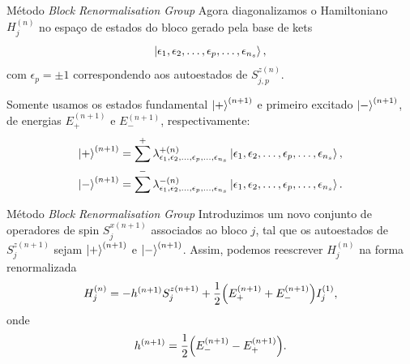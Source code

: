 \documentclass[brazil]{beamer}
\begin{document}
\begin{frame}{Método \textit{Block Renormalisation Group}}
    Agora diagonalizamos o Hamiltoniano \( H_j^{(n)} \) no espaço de estados do bloco gerado pela base de kets
    \begin{equation}
        \ket{\epsilon_1, \epsilon_2, \dotsc, \epsilon_p, \dotsc, \epsilon_{n_s}} ,
    \end{equation}
    com \( \epsilon_p = \pm 1 \) correspondendo aos autoestados de \( S_{j, p}^{z(n)} \).

    Somente usamos os estados fundamental \( \ket{+}^{(n + 1)} \) e primeiro excitado \( \ket{-}^{(n + 1)} \), de energias \( E_+^{(n + 1)} \) e \( E_-^{(n + 1)} \), respectivamente:
    \begin{gather}
        \ket{+}^{(n + 1)} = \sum^+ \lambda_{\epsilon_1, \epsilon_2, \dotsc, \epsilon_p, \dotsc, \epsilon_{n_s}}^{+ (n)} \ket{\epsilon_1, \epsilon_2, \dotsc, \epsilon_p, \dotsc, \epsilon_{n_s}} , \\
        \ket{-}^{(n + 1)} = \sum^- \lambda_{\epsilon_1, \epsilon_2, \dotsc, \epsilon_p, \dotsc, \epsilon_{n_s}}^{- (n)} \ket{\epsilon_1, \epsilon_2, \dotsc, \epsilon_p, \dotsc, \epsilon_{n_s}}.
    \end{gather}
\end{frame}

\begin{frame}{Método \textit{Block Renormalisation Group}}
    Introduzimos um novo conjunto de operadores de spin \( S_j^{x (n + 1)} \) associados ao bloco \( j \), tal que os autoestados de \( S_j^{z (n + 1)} \) sejam \( \ket{+}^{(n + 1)} \) e \( \ket{-}^{(n + 1)} \).
    Assim, podemos reescrever \( H_j^{(n)} \) na forma renormalizada
    \begin{equation}
        H_j^{(n)} = - h^{(n + 1)} S_j^{z (n + 1)} + \frac{1}{2} \qty( E_+^{(n + 1)} + E_-^{(n + 1)} ) I_j^{(1)} , \label{intrabloco}
    \end{equation}
    onde
    \begin{equation}
        h^{(n + 1)} = \frac{1}{2} \qty(E_-^{(n + 1)} - E_+^{(n + 1)}) . %
    \end{equation}
\end{frame}
\end{document}
